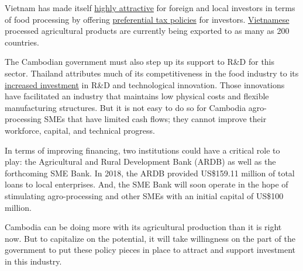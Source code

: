 \documentclass[10pt,a4paper]{letter}
\begin{document}
Vietnam has made itself \href{https://www.seavestor.com/vietnams-food-processing-industry-a-promising-option-for-foreign-investors/}{highly attractive} for foreign and local investors in terms of food processing by offering \href{https://www.foodnavigator-asia.com/Article/2019/01/02/Prosperity-project-Vietnam-s-rapidly-growing-food-processing-industry-eyes-foreign-investment?utm_source=copyright&utm_medium=OnSite&utm_campaign=copyright}{preferential tax policies} for investors. \href{http://bizhub.vn/news/foreign-investors-pour-more-money-into-food-processing-and-drinks-industry_302792.html}{Vietnamese} processed agricultural products are currently being exported to as many as 200 countries.

The Cambodian government must also step up its support to R\&D for this sector. Thailand attributes much of its competitiveness in the food industry to its \href{http://www.boi.go.th/upload/content/Food%20industry_5aa7b40bd758b.pdf}{increased investment} in R\&D and technological innovation. Those innovations have facilitated an industry that maintains low physical costs and flexible manufacturing structures. But it is not easy to do so for Cambodia agro-processing SMEs that have limited cash flows; they cannot improve their workforce, capital, and technical progress.

In terms of improving financing, two institutions could have a critical role to play: the Agricultural and Rural Development Bank (ARDB) as well as the forthcoming SME Bank. In 2018, the ARDB provided US\$159.11 million of total loans to local enterprises. And, the SME Bank will soon operate in the hope of stimulating agro-processing and other SMEs with an initial capital of US\$100 million.

Cambodia can be doing more with its agricultural production than it is right now. But to capitalize on the potential, it will take willingness on the part of the government to put these policy pieces in place to attract and support investment in this industry. 
\end{document}
